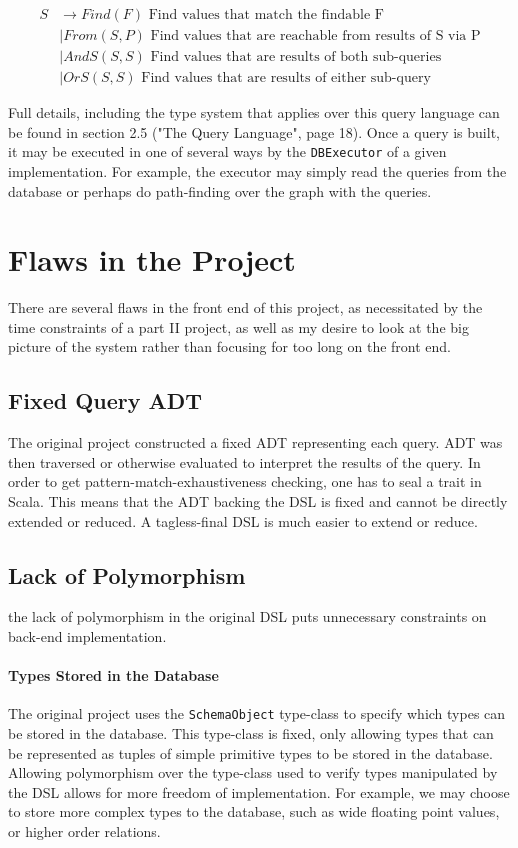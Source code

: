 \documentclass{report}
\newcommand \2[0]{\textbf{2}}
\newcommand \3[0]{\textbf{3}}
\begin{document}
    \begin{equation}
        \label{SDefinition}
        \begin{split}
        S & \rightarrow Find(F) \mbox{ Find values that match the findable F}\\
        &\mid From(S, P) \mbox{ Find values that are reachable from results of S via P}\\
        &\mid AndS(S, S) \mbox{ Find values that are results of both sub-queries}\\
        &\mid OrS(S, S) \mbox{ Find values that are results of either sub-query}
        \end{split}
    \end{equation} 

Full details, including the type system that applies over this query language can be found in section 2.5 ("The Query Language", page 18). Once a query is built, it may be executed in one of several ways by the \texttt{DBExecutor} of a given implementation. For example, the executor may simply read the queries from the database or perhaps do path-finding over the graph with the queries.
\section{Flaws in the Project}
There are several flaws in the front end of this project, as necessitated by the time constraints of a part II project, as well as my desire to look at the big picture of the system rather than focusing for too long on the front end.
\subsection{Fixed Query ADT}
The original project constructed a fixed ADT representing each query. ADT was then traversed or otherwise evaluated to interpret the results of the query. In order to get pattern-match-exhaustiveness checking, one has to seal a trait in Scala. This means that the ADT backing the DSL is fixed and cannot be directly extended or reduced. A tagless-final DSL is much easier to extend or reduce.

\subsection{Lack of Polymorphism}
the lack of polymorphism in the original DSL puts unnecessary constraints on back-end implementation.
\paragraph{Types Stored in the Database}
The original project uses the \texttt{SchemaObject} type-class to specify which types can be stored in the database. This type-class is fixed, only allowing types that can be represented as tuples of simple primitive types to be stored in the database. Allowing polymorphism over the type-class used to verify types manipulated by the DSL allows for more freedom of implementation. For example, we may choose to store more complex types to the database, such as wide floating point values, or higher order relations.
\end{document}

